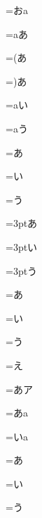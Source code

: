 =\hbox{\rmlh おa}


=\hbox{\rmlh aあ}

=\hbox{\rmlh (あ}

=\hbox{\rmlh )あ}

=\hbox{\rmlh aい}

=\hbox{\rmlh aう}


=\hbox{\rmlh あ\kern3pt}

=\hbox{\rmlh い\kern3pt}

=\hbox{\rmlh う\kern3pt}


=\hbox{\rmlh \kern3ptあ}

=\hbox{\rmlh \kern3ptい}

=\hbox{\rmlh \kern3ptう}


=\hbox{\rmlh あ\hbox{}}

=\hbox{\rmlh い\hbox{}}

=\hbox{\rmlh う\hbox{}}

=\hbox{\rmlh え\hbox{}}

=\hbox{\rmlh あ\hbox{ア}}

=\hbox{\rmlh あ\hbox{a}}

=\hbox{\rmlh い\hbox{a}}


=\hbox{\rmlh \hbox{}あ}

=\hbox{\rmlh \hbox{}い}

=\hbox{\rmlh \hbox{}う}

